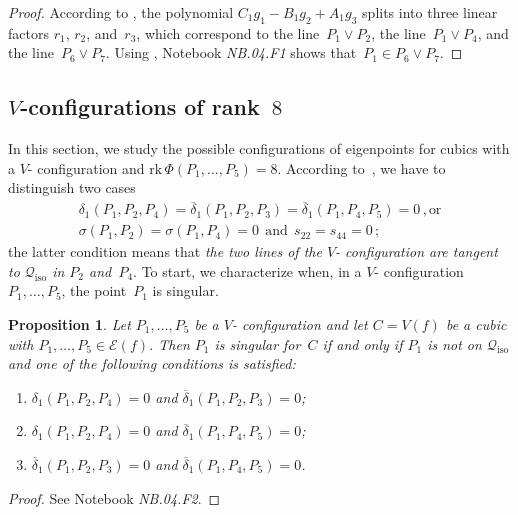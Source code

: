 \documentclass[a4paper, 11pt, reqno]{amsart}
\theoremstyle{plain}
\newtheorem{prop}[lemma]{Proposition}
\theoremstyle{definition}
\newcommand{\nb}[2]{\textsl{{NB}.{#1}.{#2}}}
\newcommand{\rk}{\ensuremath{\mathrm{rk}}}
\newcommand{\iso}{\mathcal{Q}_{\mathrm{iso}}}
\newcommand{\Eig}[1]{\mathcal{E}\!\left( {#1} \right)}
\begin{document}
\begin{proof}
According to , the polynomial
$C_1g_1-B_1g_2+A_1g_3$ splits into three linear factors $r_1$, $r_2$, and~$r_3$, which
correspond to the line~$P_1 \vee P_2$, the line~$P_1 \vee P_4$, and the line~$P_6 \vee P_7$. Using , Notebook \nb{04}{F1} shows that~$P_1\in P_6 \vee P_7$.
\end{proof}


\subsection{\texorpdfstring{$V$}{V}-configurations of rank~\texorpdfstring{$8$}{8}}
\label{rank_8}
%
In this section, we study the possible configurations of
eigenpoints for cubics with a $V$- configuration
and $\rk \, \Phi(P_1, \dots, P_5) = 8$. According
to~, we have to distinguish two cases
%
\begin{gather}
  \delta_1(P_1, P_2, P_4)=\overline{\delta}_1(P_1, P_2, P_3) =
  \overline{\delta}_1(P_1, P_4, P_5) = 0 \,, \text{or}
  \label{rk8_1} \\
  \sigma(P_1, P_2) = \sigma(P_1, P_4) = 0 \ \ \mbox{and} \ \ s_{22} = s_{44} = 0 \,;
  \label{rk8_2}
\end{gather}
%
the latter condition means that \emph{the two lines of
the $V$- configuration are tangent to $\iso$ in $P_2$ and~$P_4$}.
%
To start, we characterize when, in a $V$- configuration
$P_1, \dotsc, P_5$, the point~$P_1$ is singular.

\begin{prop}
\label{proposition:P1_sing}
Let $P_1, \dots, P_5$ be a $V$- configuration and let
$C = V(f)$ be a cubic with
$P_1, \dots, P_5\in \Eig{f}$. Then $P_1$ is
singular for~$C$ if
and only if $P_1$ is not on $\iso$ and one of the following conditions
is satisfied:
%
\begin{enumerate}
  \item $\delta_1(P_1, P_2, P_4) = 0$ and $\overline{\delta}_1(P_1, P_2, P_3) = 0$;
  \item $\delta_1(P_1, P_2, P_4) = 0$ and $\overline{\delta}_1(P_1, P_4, P_5) = 0$;
  \item $\overline{\delta}_1(P_1, P_2, P_3) = 0$ and
  $\overline{\delta}_1(P_1, P_4, P_5) = 0$.
\end{enumerate}
%
\end{prop}
\begin{proof}
See Notebook \nb{04}{F2}.
\end{proof}
\end{document}
